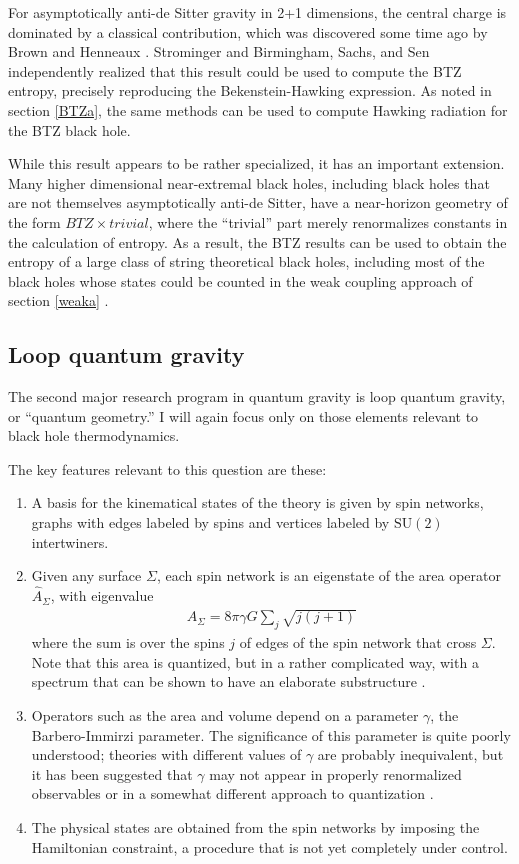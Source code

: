 \documentclass[11pt]{article}
\begin{document}
For asymptotically anti-de Sitter gravity in 2+1 dimensions, the 
central charge is dominated by a classical contribution, which was 
discovered some time ago by Brown and Henneaux \cite{BrownHen}.  
Strominger \cite{Strominger} and Birmingham, Sachs, and Sen 
\cite{BSS} independently realized that this result could be used to 
compute the BTZ  entropy, precisely reproducing the 
Bekenstein-Hawking expression.  As noted in section \ref{BTZa},
the same methods can be used to compute Hawking radiation for
the BTZ black hole.

While this result appears to be rather specialized, it has an important
extension.  Many higher dimensional near-extremal black holes,
including black holes that are not themselves asymptotically anti-de 
Sitter, have a near-horizon geometry of the form 
$\mathit{BTZ}\times\mathit{trivial}$, where the ``trivial'' part merely 
renormalizes constants in the calculation of entropy.  As a result, the 
BTZ results can be used to obtain the entropy of a large class of string
theoretical black holes, including most of the black holes whose states 
could be counted in the weak coupling approach of section \ref{weaka} 
\cite{Skenderisb}.

\subsection{Loop quantum gravity \label{loopa}}

The second major research program in quantum gravity is loop 
quantum gravity, or ``quantum geometry.''  I will again focus 
only on those elements relevant to black hole thermodynamics.

The key features  relevant to this question are these:
\begin{enumerate} 
\item A basis for the kinematical states of the theory is given by
spin networks, graphs with edges labeled by 
spins and vertices labeled by $\mathrm{SU}(2)$ intertwiners.
\item Given any surface $\Sigma$, each spin network is an eigenstate 
of the area operator ${\hat A}_\Sigma$, with eigenvalue
\begin{align}
A_\Sigma = 8\pi\gamma G \sum_j \sqrt{j(j+1)} 
\label{Carlipg5}
\end{align}
where the sum is over the spins $j$ of edges of the spin network 
that cross $\Sigma$.  Note that this area is quantized, but in a
rather complicated way, with a spectrum that can be shown to have
an elaborate substructure \cite{Corichi,Agullo}.
\item Operators such as the area and volume  depend on a
parameter $\gamma$, the Barbero-Immirzi parameter.
The significance of this 
parameter is quite poorly understood; theories with different values of 
$\gamma$ are probably inequivalent, but it has been suggested that 
$\gamma$ may not appear in properly renormalized observables 
\cite{Jacobsone} or in a somewhat different approach to quantization 
\cite{Alexandrov}.
\item The physical states are obtained from the spin networks by
imposing the Hamiltonian constraint, a procedure that is not yet
completely under control.
\end{enumerate}
\end{document}
